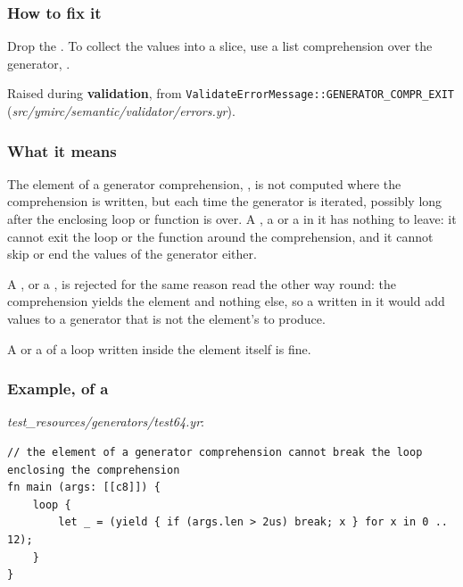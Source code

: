 \subsubsection*{How to fix it}

Drop the . To collect the values into a slice, use a list comprehension over the generator, .

\label{sec:codes:e4301}

Raised during \textbf{validation}, from \texttt{ValidateErrorMessage::\allowbreak{}GENERATOR\_\allowbreak{}COMPR\_\allowbreak{}EXIT} (\textit{src/\allowbreak{}ymirc/\allowbreak{}semantic/\allowbreak{}validator/\allowbreak{}errors.yr}).

\subsubsection*{What it means}

The element of a generator comprehension, , is not computed where the comprehension is written, but each time the generator is iterated, possibly long after the enclosing loop or function is over. A , a  or a  in it has nothing to leave: it cannot exit the loop or the function around the comprehension, and it cannot skip or end the values of the generator either.

A , or a , is rejected for the same reason read the other way round: the comprehension yields the element and nothing else, so a  written in it would add values to a generator that is not the element's to produce.

A  or a  of a loop written inside the element itself is fine.

\subsubsection*{Example, of a }

\textit{test\_\allowbreak{}resources/\allowbreak{}generators/\allowbreak{}test64.yr}:

\begin{lstlisting}[style=coloredverbatimError]
// the element of a generator comprehension cannot break the loop enclosing the comprehension
fn main (args: [[c8]]) {
    loop {
        let _ = (yield { if (args.len > 2us) break; x } for x in 0 .. 12);
    }
}
\end{lstlisting}

